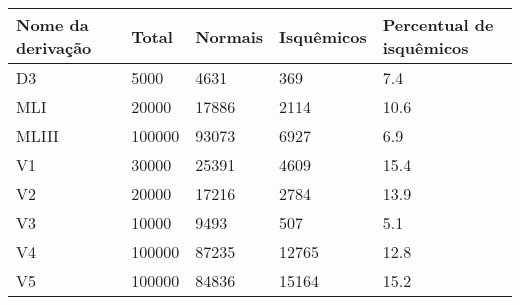 \begin{tabular}{lllll}
    \toprule
    Nome da derivação & Total & Normais & Isquêmicos & Percentual de isquêmicos\\
    \midrule
    D3    &   5000 &   4631 &   369 &  7.4\\
    MLI   &  20000 &  17886 &  2114 & 10.6\\
    MLIII & 100000 &  93073 &  6927 &  6.9\\
    V1    &  30000 &  25391 &  4609 & 15.4\\
    V2    &  20000 &  17216 &  2784 & 13.9\\
    V3    &  10000 &   9493 &   507 &  5.1\\
    V4    & 100000 &  87235 & 12765 & 12.8\\
    V5    & 100000 &  84836 & 15164 & 15.2\\
    \bottomrule
\end{tabular}
